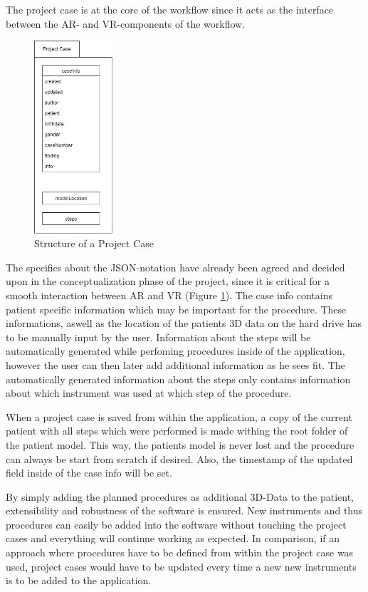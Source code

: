 The project case is at the core of the workflow since it acts as the interface between the AR- and VR-components of the workflow.

\begin{figure}[ht]
    \centering
    \includegraphics[width=110px]{images/implementation/project_case.png}
    \caption{\label{fig::ImplementationProjectCase}Structure of a Project Case}
\end{figure}

The specifics about the JSON-notation have already been agreed and decided upon in the conceptualization phase of the project, since it is critical for a smooth interaction between AR and VR (Figure \ref{fig::ImplementationProjectCase}). 
The case info contains patient specific information which may be important for the procedure.
These informations, aswell as the location of the patients 3D data on the hard drive has to be manually input by the user.
Information about the steps will be automatically generated while perfoming procedures inside of the application, however the user can then later add additional information as he sees fit.
The automatically generated information about the steps only contains information about which instrument was used at which step of the procedure.

When a project case is saved from within the application, a copy of the current patient with all steps which were performed is made withing the root folder of the patient model.
This way, the patients model is never lost and the procedure can always be start from scratch if desired.
Also, the timestamp of the updated field inside of the case info will be set.

By simply adding the planned procedures as additional 3D-Data to the patient, extensibility and robustness of the software is ensured.
New instruments and thus procedures can easily be added into the software without touching the project cases and everything will continue working as expected.
In comparison, if an approach where procedures have to be defined from within the project case was used, project cases would have to be updated every time a new new instruments is to be added to the application.
